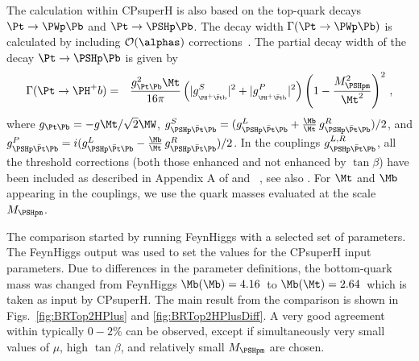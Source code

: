 The calculation within {\sc CPsuperH} is also based on the top-quark
decays $\Pt \to \PWp \Pb$ and $\Pt \to \PSHp \Pb$.  The decay width
$\Gamma(\Pt \to \PWp \Pb)$ is calculated by including ${\cal
  O}(\alphas)$ corrections~\cite{Chetyrkin:1999br}.
%
The partial decay width of the decay $\Pt \to \PSHp \Pb$ is given by
\begin{eqnarray}
\Gamma(\Pt\rightarrow \PH^+ b)&=&\frac{g_{\Pt\Pb}^2\Mt}{16\pi}
\left(|g^S_{_{{\PH}^+\bar{\Pt}{\rm b}}}|^2+|g^P_{_{\PH^+\bar{\Pt}{\rm b}}}|^2\right)
\left(1-\frac{\MHpm^2}{\Mt^2}\right)^2\,,
\end{eqnarray}
where $g_{\Pt\Pb} = - g \Mt/\sqrt{2} \MW$, 
      $g^S_{\PSHp\bar{\Pt}\Pb}=(g^L_{\PSHp\bar{\Pt}\Pb} + 
      \frac{\Mb}{\Mt}\, g^R_{\PSHp\bar{\Pt}\Pb})/2$, 
      and $g^P_{\PSHp\bar{\Pt}\Pb}=i(g^L_{\PSHp\bar{\Pt}\Pb} 
      - \frac{\Mb}{\Mt}\, g^R_{\PSHp\bar{\Pt}\Pb})/2$.  
In the couplings $g^{L,R}_{\PSHp\bar{\Pt}\Pb}$, all the
threshold corrections (both those enhanced and not enhanced by
$\tan\beta$) have been included as described in Appendix A of
 and \Refs~\cite{Carena:2002bb,Ellis:2009di},
see also . 
%
For $\Mt$ and $\Mb$ appearing in the couplings, we use the
quark masses evaluated at the scale $\MHpm$.

The comparison started by running {\sc FeynHiggs} with a selected set
of parameters. The {\sc FeynHiggs} output was used to set the values
for the CPsuperH input parameters. Due to differences in the parameter
definitions, the bottom-quark mass was changed from {\sc FeynHiggs}
$\Mb(\Mb) = 4.16$\UGeV\ to $\Mb(\Mt) = 2.64$\UGeV\ 
which is taken as input by {\sc CPsuperH}. The main result
from the comparison is shown in Figs.~\ref{fig:BRTop2HPlus} and
\ref{fig:BRTop2HPlusDiff}. A very good agreement within typically $0{-}2\%$ 
can be observed, except if simultaneously very small values of $\mu$, 
high $\tan\beta$, and relatively small $\MHpm$ are chosen.

